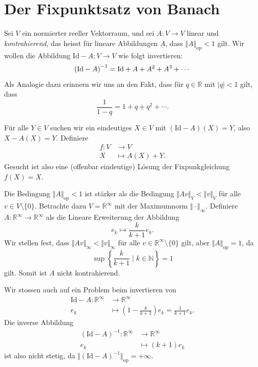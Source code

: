 \documentclass[../main.tex]{subfiles}
\begin{document}
\section{Der Fixpunktsatz von Banach}
\begin{motivation}
  Sei $V$ ein normierter reeller Vektorraum,
  und sei $A \colon V \to V$ linear und \emph{kontrahierend},
  das heisst für lineare Abbildungen $A$, dass
  $\Vert A \Vert_{\text{op}} < 1$ gilt.
  Wir wollen die Abbildung $\text{Id} - A \colon V \to V$ wie folgt
  invertieren:
  \[
    {(\text{Id} - A)}^{-1} = \textup{Id} + A + A^2 + A^3 + \cdots
  \]
  Als Analogie dazu erinnern wir uns an den Fakt, dass
  für $q \in \mathbb{R}$ mit $|q| < 1$ gilt, dass
  \[
    \frac{1}{1-q} = 1 + q + q^2 + \cdots.
  \]

  Für alle $Y \in V$ suchen wir ein eindeutiges $X \in V$ 
  mit $(\text{Id} - A)(X) = Y$, also
  $X - A(X) = Y$.
  Definiere
  \begin{align*}
    f \colon V & \to V \\
    X & \mapsto A(X) + Y.
  \end{align*}
  Gesucht ist also eine (offenbar eindeutige) Lösung
  der Fixpunkgleichung $f(X) = X$.
\end{motivation}

\begin{remark}
  Die Bedingung $\Vert A \Vert_{\text{op}} < 1$ ist stärker als die
  Bedingung $\Vert A v \Vert_V < \Vert v \Vert_V$ für alle $v
  \in V \setminus \{0\}$.
  Betrachte dazu $V = \mathbb{R}^{\infty}$ mit der Maximumnorm
  $\Vert \cdot \Vert_{\infty}$.
  Definiere $A \colon \mathbb{R}^{\infty} \to \mathbb{R}^{\infty}$ 
  als die Lineare Erweiterung der Abbildung
  \[
    e_k \mapsto \frac{k}{k+1}e_k.
  \]
  Wir stellen fest, dass $\Vert A v \Vert_{\infty} < \Vert v \Vert_{\infty}$ 
  für alle $v \in \mathbb{R}^{\infty} \setminus \{0\}$ gilt,
  aber $\Vert A \Vert_{\text{op}} = 1$, da
  \[
    \sup \left\{\frac{k}{k+1} \mid k \in \mathbb{N}\right\} = 1
  \]
  gilt. Somit ist $A$ nicht kontrahierend.
  
  Wir stossen auch auf ein Problem beim invertieren von
  \begin{align*}
    \text{Id} - A \colon \mathbb{R}^{\infty} & \to \mathbb{R}^{\infty} \\
    e_k & \mapsto \left( 1 - \frac{k}{k+1} \right)e_k
    = \frac{1}{k+1}e_k.
  \end{align*}
  Die inverse Abbildung
  \begin{align*}
    {(\text{Id} - A)}^{-1} \colon \mathbb{R}^{\infty} & \to \mathbb{R}^{\infty} \\
    e_k & \mapsto (k+1) e_k
  \end{align*}
  ist also nicht stetig, da $\Vert {(\text{Id} - A)}^{-1} \Vert_{\text{op}}
  = +\infty$.
\end{remark}
\end{document}
